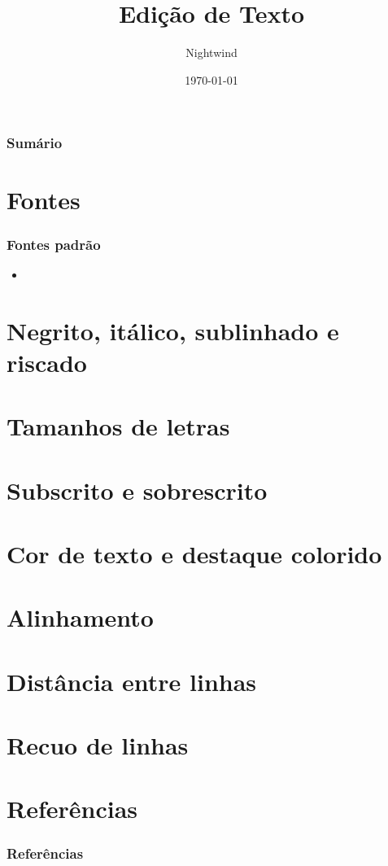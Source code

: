\documentclass{beamer}
\title{Edição de Texto}
\author{Nightwind}
\institute[CTISM]{Colégio Técnico Industrial de Santa Maria}
\date{\today}
\begin{document}
\frame{\titlepage}

\begin{frame}
    \frametitle{Sumário}
    \tableofcontents
\end{frame}

\section{Fontes}
\begin{frame}
    \frametitle{Fontes padrão}

    \begin{itemize}
        \item 
    \end{itemize}

\end{frame}


\section{Negrito, itálico, sublinhado e riscado}

\section{Tamanhos de letras}

\section{Subscrito e sobrescrito}

\section{Cor de texto e destaque colorido}

\section{Alinhamento}

\section{Distância entre linhas}

\section{Recuo de linhas}

\section{Referências}
\begin{frame}[allowframebreaks]
    \frametitle{Referências}
    \nocite{*}
    \printbibliography[keyword={editText}]
\end{frame}
\end{document}

